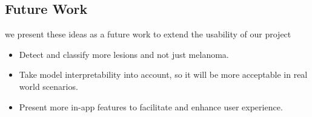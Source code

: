        
        
\subsection{Future Work}
    we present these ideas as a future work to extend the usability of our project
    \begin{itemize}
        \item Detect and classify more lesions and not just melanoma.
        \item Take model interpretability into account, so it will be more acceptable in real world scenarios.
        \item Present more in-app features to facilitate and enhance user experience. 
    \end{itemize}